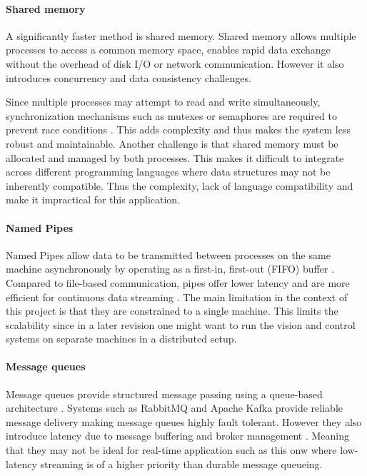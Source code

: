 \paragraph*{Shared memory}
A significantly faster method is shared memory. Shared memory allows multiple processes to access a common memory space, enables rapid data exchange without the overhead of disk I/O or network communication. However it also introduces concurrency and data consistency challenges. \cite{gray_interprocess_2003}

Since multiple processes may attempt to read and write simultaneously, synchronization mechanisms such as mutexes or semaphores are required to prevent race conditions \cite{burns_real-time_2009}. This adds complexity and thus makes the system less robust and maintainable. Another challenge is that shared memory must be allocated and managed by both processes. This makes it difficult to integrate across different programming languages where data structures may not be inherently compatible. Thus the complexity, lack of language compatibility and make it impractical for this application.

\paragraph*{Named Pipes}
Named Pipes allow data to be transmitted between processes on the same machine asynchronously by operating as a first-in, first-out (FIFO) buffer \cite{gray_interprocess_2003}. Compared to file-based communication, pipes offer lower latency and are more efficient for continuous data streaming \cite{gray_interprocess_2003}. The main limitation in the context of this project is that they are constrained to a single machine. This limits the scalability since in a later revision one might want to run the vision and control systems on separate machines in a distributed setup. 

\paragraph*{Message queues}
Message queues provide structured message passing using a queue-based architecture \cite{kleppmann_designing_2017}. Systems such as RabbitMQ and Apache Kafka provide reliable message delivery making message queues highly fault tolerant. However they also introduce latency due to message buffering and broker management \cite{kleppmann_designing_2017}. Meaning that they may not be ideal for real-time application such as this onw where low-latency streaming is of a higher priority than durable message queueing.

